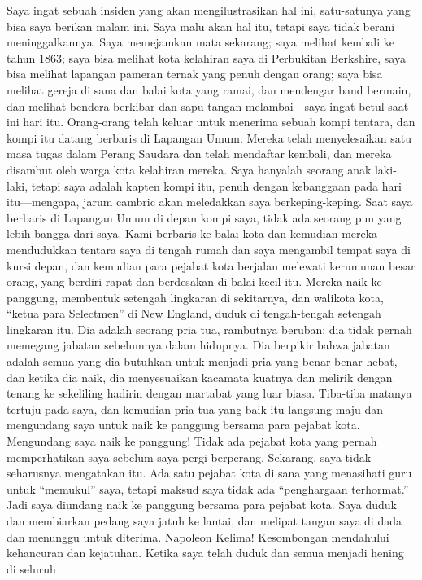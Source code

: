 \documentclass[
  letterpaper,
  DIV=11,
  numbers=noendperiod]{scrreprt}
\begin{document}
Saya ingat sebuah insiden yang akan mengilustrasikan hal ini,
satu-satunya yang bisa saya berikan malam ini. Saya malu akan hal itu,
tetapi saya tidak berani meninggalkannya. Saya memejamkan mata sekarang;
saya melihat kembali ke tahun 1863; saya bisa melihat kota kelahiran
saya di Perbukitan Berkshire, saya bisa melihat lapangan pameran ternak
yang penuh dengan orang; saya bisa melihat gereja di sana dan balai kota
yang ramai, dan mendengar band bermain, dan melihat bendera berkibar dan
sapu tangan melambai---saya ingat betul saat ini hari itu. Orang-orang
telah keluar untuk menerima sebuah kompi tentara, dan kompi itu datang
berbaris di Lapangan Umum. Mereka telah menyelesaikan satu masa tugas
dalam Perang Saudara dan telah mendaftar kembali, dan mereka disambut
oleh warga kota kelahiran mereka. Saya hanyalah seorang anak laki-laki,
tetapi saya adalah kapten kompi itu, penuh dengan kebanggaan pada hari
itu---mengapa, jarum cambric akan meledakkan saya berkeping-keping. Saat
saya berbaris di Lapangan Umum di depan kompi saya, tidak ada seorang
pun yang lebih bangga dari saya. Kami berbaris ke balai kota dan
kemudian mereka mendudukkan tentara saya di tengah rumah dan saya
mengambil tempat saya di kursi depan, dan kemudian para pejabat kota
berjalan melewati kerumunan besar orang, yang berdiri rapat dan
berdesakan di balai kecil itu. Mereka naik ke panggung, membentuk
setengah lingkaran di sekitarnya, dan walikota kota, ``ketua para
Selectmen'' di New England, duduk di tengah-tengah setengah lingkaran
itu. Dia adalah seorang pria tua, rambutnya beruban; dia tidak pernah
memegang jabatan sebelumnya dalam hidupnya. Dia berpikir bahwa jabatan
adalah semua yang dia butuhkan untuk menjadi pria yang benar-benar
hebat, dan ketika dia naik, dia menyesuaikan kacamata kuatnya dan
melirik dengan tenang ke sekeliling hadirin dengan martabat yang luar
biasa. Tiba-tiba matanya tertuju pada saya, dan kemudian pria tua yang
baik itu langsung maju dan mengundang saya untuk naik ke panggung
bersama para pejabat kota. Mengundang saya naik ke panggung! Tidak ada
pejabat kota yang pernah memperhatikan saya sebelum saya pergi
berperang. Sekarang, saya tidak seharusnya mengatakan itu. Ada satu
pejabat kota di sana yang menasihati guru untuk ``memukul'' saya, tetapi
maksud saya tidak ada ``penghargaan terhormat.'' Jadi saya diundang naik
ke panggung bersama para pejabat kota. Saya duduk dan membiarkan pedang
saya jatuh ke lantai, dan melipat tangan saya di dada dan menunggu untuk
diterima. Napoleon Kelima! Kesombongan mendahului kehancuran dan
kejatuhan. Ketika saya telah duduk dan semua menjadi hening di seluruh
\end{document}
